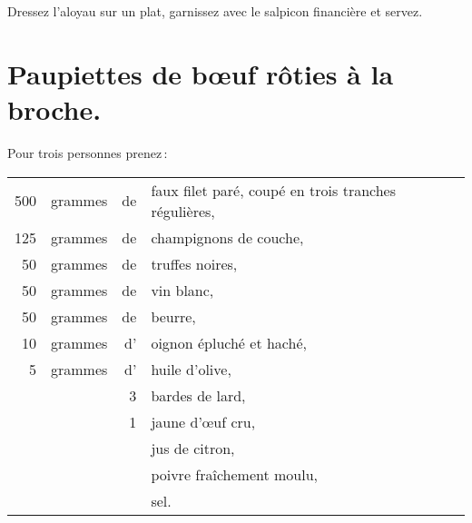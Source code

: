 Dressez l'aloyau sur un plat, garnissez avec le salpicon financière et servez.

\section*{\centering Paupiettes de bœuf rôties à la broche.}
{}

Pour trois personnes prenez :

\medskip

\footnotesize
\begin{longtable}{rrrp{16em}}
    500 & grammes & de & faux filet paré, coupé en trois tranches régulières,                             \\
    125 & grammes & de & champignons de couche,                                                           \\
     50 & grammes & de & truffes noires,                                                                  \\
     50 & grammes & de & vin blanc,                                                                       \\
     50 & grammes & de & beurre,                                                                          \\
     10 & grammes & d' & oignon épluché et haché,                                                         \\
      5 & grammes & d' & huile d'olive,                                                                   \\
        &         &  3 & bardes de lard,                                                                  \\
        &         &  1 & jaune d'œuf cru,                                                                 \\
        &         &    & jus de citron,                                                                   \\
        &         &    & poivre fraîchement moulu,                                                        \\
        &         &    & sel.                                                                             \\
\end{longtable}
\normalsize

